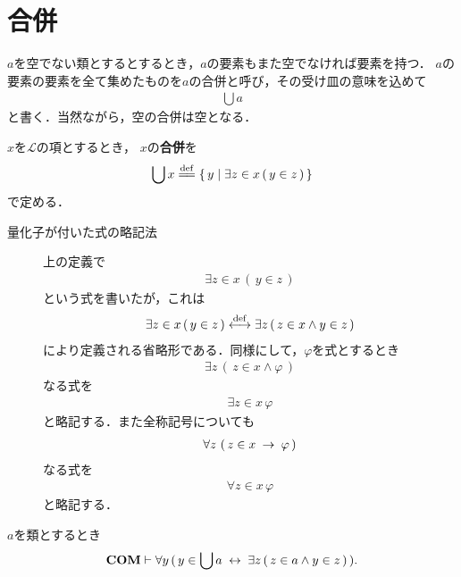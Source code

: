 \section{合併}
	$a$を空でない類とするとするとき，$a$の要素もまた空でなければ要素を持つ．
	$a$の要素の要素を全て集めたものを$a$の合併と呼び，その受け皿の意味を込めて
	\begin{align}
		\bigcup a
	\end{align}
	と書く．当然ながら，空の合併は空となる．
	
	\begin{screen}
		\begin{dfn}[合併]
			$x$を$\mathcal{L}$の項とするとき，
			$x$の{\bf 合併}を
			\begin{align}
				\bigcup x \defeq \Set{y}{\exists z \in x\, (\, y \in z\, )}
				\label{eq:definition_of_union_1}
			\end{align}
			で定める．
		\end{dfn}
	\end{screen}
	
	\begin{description}
		\item[量化子が付いた式の略記法]
		上の定義で
		\begin{align}
			\exists z \in x\, (\, y \in z\, )
		\end{align}
		という式を書いたが，これは
		\begin{align}
			\exists z \in x\, (\, y \in z\, ) \overset{\mathrm{def}}{\longleftrightarrow} 
			\exists z\, (\, z \in x \wedge y \in z\, )
		\end{align}
		により定義される省略形である．同様にして，$\varphi$を式とするとき
		\begin{align}
			\exists z\, \left(\, z \in x \wedge \varphi\, \right)
		\end{align}
		なる式を
		\begin{align}
			\exists z \in x\, \varphi
		\end{align}
		と略記する．また全称記号についても
		\begin{align}
			\forall z\, \left(\, z \in x \hspace{0.25em}\rightarrow\hspace{0.25em} \varphi\, \right)
		\end{align}
		なる式を
		\begin{align}
			\forall z \in x\, \varphi
		\end{align}
		と略記する．
	\end{description}
	
	\begin{screen}
		\begin{thm}[合併の内包性]
		\label{thm:comprehension_of_unions}
			$a$を類とするとき
			\begin{align}
				\mbox{\bf COM} \vdash \forall y\, (\, y \in \bigcup a \hspace{0.25em}\leftrightarrow\hspace{0.25em} 
				\exists z\, (\, z \in a \wedge y \in z\, )\, ).
			\end{align}
		\end{thm}
	\end{screen}
	
